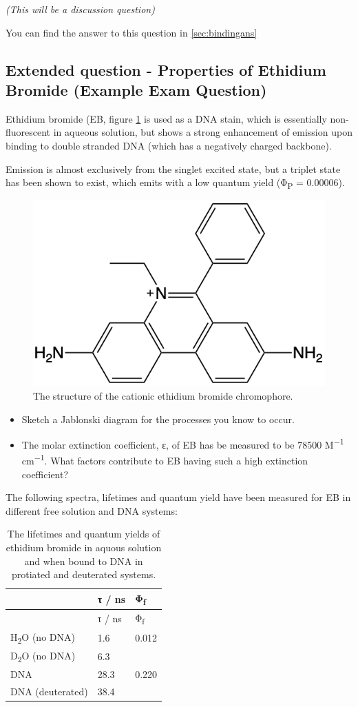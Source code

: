 \documentclass[
]{book}
\begin{document}
\emph{(This will be a discussion question)}

You can find the answer to this question in \ref{sec:bindingans}

\hypertarget{sec:examethidium}{%
\subsection{Extended question - Properties of Ethidium Bromide (Example Exam Question)}\label{sec:examethidium}}

Ethidium bromide (EB, figure \ref{fig:ethidiumstructure} is used as a DNA stain, which is essentially non-fluorescent in aqueous solution, but shows a strong enhancement of emission upon binding to double stranded DNA (which has a negatively charged backbone).

Emission is almost exclusively from the singlet excited state, but a triplet state has been shown to exist, which emits with a low quantum yield (Φ\textsubscript{P} = 0.00006).

\begin{figure}

{\centering \includegraphics[width=0.3\linewidth]{images/ethidiumstructure} 

}

\caption{The structure of the cationic ethidium bromide chromophore.}\label{fig:ethidiumstructure}
\end{figure}

\begin{itemize}
\item
  Sketch a Jablonski diagram for the processes you know to occur.
\item
  The molar extinction coefficient, ε, of EB has be measured to be 78500 M\textsuperscript{−1} cm\textsuperscript{−1}. What factors contribute to EB having such a high extinction coefficient?
\end{itemize}

The following spectra, lifetimes and quantum yield have been measured for EB in different free solution and DNA systems:

\begin{longtable}[]{@{}lll@{}}
\caption{\label{tab:ethidiumlifetime} The lifetimes and quantum yields of ethidium bromide in aquous solution and when bound to DNA in protiated and deuterated systems.}\tabularnewline
\toprule
& τ / ns & Φ\textsubscript{f} \\
\midrule
\endfirsthead
\toprule
& τ / ns & Φ\textsubscript{f} \\
\midrule
\endhead
H\textsubscript{2}O (no DNA) & 1.6 & 0.012 \\
D\textsubscript{2}O (no DNA) & 6.3 & \\
DNA & 28.3 & 0.220 \\
DNA (deuterated) & 38.4 & \\
\bottomrule
\end{longtable}
\end{document}
